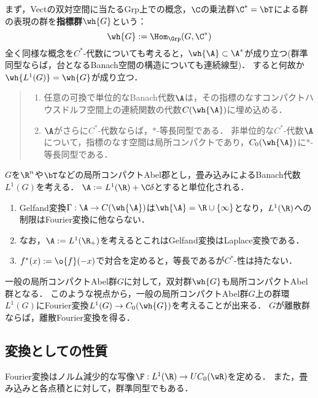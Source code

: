\documentclass[uplatex,dvipdfmx]{jsreport}
\begin{document}
\begin{remarks}[指標群について]\tiny
    まず，Vectの双対空間に当たるGrp上での概念，$\C$の乗法群$\C^*=\bT$による群の表現の群を\textbf{指標群}$\wh{G}$という：
    \[\wh{G}:=\Hom_\Grp(G,\C^*)\]
    全く同様な概念を$C^*$-代数についても考えると，$\wh{\A}\subset\A^*$が成り立つ(群準同型ならば，台となるBanach空間の構造についても連続線型)．
    すると何故か$\wh{L^1(G)}=\wh{G}$が成り立つ．
    \begin{quote}
        \begin{enumerate}
            \item 任意の可換で単位的なBanach代数$\A$は，その指標のなすコンパクトハウスドルフ空間上の連続関数の代数$C(\wh{\A})$に埋め込める．
            \item $\A$がさらに$C^*$-代数ならば，$*$-等長同型である．
            非単位的な$C^*$-代数$\A$について，指標のなす空間は局所コンパクトであり，$C_0(\wh{\A})$に$*$-等長同型である．
        \end{enumerate}
    \end{quote}
    $G$を$\R^n$や$\bT$などの局所コンパクトAbel郡とし，畳み込みによるBanach代数$L^1(G)$を考える．
    $\A:=L^1(\R)+\C\delta$とすると単位化される．
    \begin{enumerate}
        \item Gelfand変換$\Gamma:\A\to C(\wh{\A})$は$\wh{\A}=\R\cup\{\infty\}$となり，$L^1(\R)$への制限はFourier変換に他ならない．
        \item なお，$\A:=L^1(\R_+)$を考えるとこれはGelfand変換はLaplace変換である．
        \item $f^*(x):=\o{f}(-x)$で対合を定めると，等長であるが$C^*$-性は持たない．
    \end{enumerate}
    一般の局所コンパクトAbel群$G$に対して，双対群$\wh{G}$も局所コンパクトAbel群となる．
    このような視点から，一般の局所コンパクトAbel群$G$上の群環$L^1(G)$にFourier変換$L^1(G)\to C_0(\wh{G})$を考えることが出来る．
    $G$が離散群ならば，離散Fourier変換を得る．
\end{remarks}

\subsection{変換としての性質}

\begin{tcolorbox}[colframe=ForestGreen, colback=ForestGreen!10!white,breakable,colbacktitle=ForestGreen!40!white,coltitle=black,fonttitle=\bfseries\sffamily,
title=]
    Fourier変換はノルム減少的な写像$\F:L^1(\R)\to UC_0(\wR)$を定める．
    また，畳み込みと各点積とに対して，群準同型でもある．
\end{tcolorbox}
\end{document}
